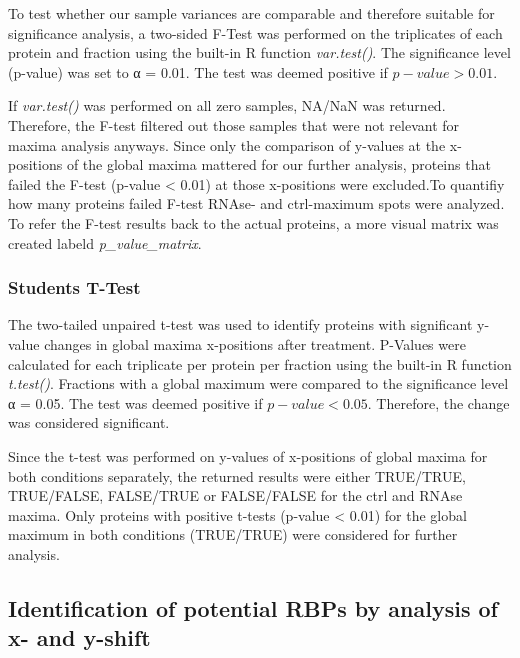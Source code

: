 \documentclass[
]{article}
\begin{document}
To test whether our sample variances are comparable and therefore
suitable for significance analysis, a two-sided F-Test was performed on
the triplicates of each protein and fraction using the built-in R
function \emph{var.test()}. The significance level (p-value) was set to
α = 0.01. The test was deemed positive if \(p-value > 0.01\).

If \emph{var.test()} was performed on all zero samples, NA/NaN was
returned. Therefore, the F-test filtered out those samples that were not
relevant for maxima analysis anyways. Since only the comparison of
y-values at the x-positions of the global maxima mattered for our
further analysis, proteins that failed the F-test (p-value \textless{}
0.01) at those x-positions were excluded.To quantifiy how many proteins
failed F-test RNAse- and ctrl-maximum spots were analyzed. To refer the
F-test results back to the actual proteins, a more visual matrix was
created labeld \emph{p\_value\_matrix}.

\hypertarget{students-t-test}{%
\subsubsection{Students T-Test}\label{students-t-test}}

The two-tailed unpaired t-test was used to identify proteins with
significant y-value changes in global maxima x-positions after
treatment. P-Values were calculated for each triplicate per protein per
fraction using the built-in R function \emph{t.test()}. Fractions with a
global maximum were compared to the significance level α = 0.05. The
test was deemed positive if \(p-value < 0.05\). Therefore, the change
was considered significant.

Since the t-test was performed on y-values of x-positions of global
maxima for both conditions separately, the returned results were either
TRUE/TRUE, TRUE/FALSE, FALSE/TRUE or FALSE/FALSE for the ctrl and RNAse
maxima. Only proteins with positive t-tests (p-value \textless{} 0.01)
for the global maximum in both conditions (TRUE/TRUE) were considered
for further analysis.

\hypertarget{identification-of-potential-rbps-by-analysis-of-x--and-y-shift}{%
\subsection{Identification of potential RBPs by analysis of x- and
y-shift}\label{identification-of-potential-rbps-by-analysis-of-x--and-y-shift}}
\end{document}
